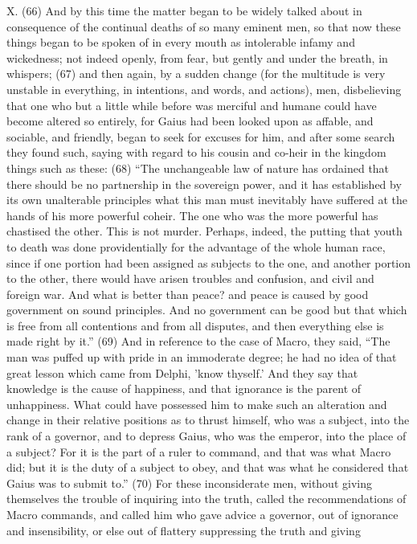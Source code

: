 X. (66) And by this time the matter began to be widely talked about in consequence of the continual
deaths of so many eminent men, so that now these things began to be spoken of in every mouth as
intolerable infamy and wickedness; not indeed openly, from fear, but gently and under the breath, in
whispers; (67) and then again, by a sudden change (for the multitude is very unstable in everything,
in intentions, and words, and actions), men, disbelieving that one who but a little while before was
merciful and humane could have become altered so entirely, for Gaius had been looked upon as
affable, and sociable, and friendly, began to seek for excuses for him, and after some search they
found such, saying with regard to his cousin and co-heir in the kingdom things such as these: (68)
``The unchangeable law of nature has ordained that there should be no partnership in the sovereign
power, and it has established by its own unalterable principles what this man must inevitably have
suffered at the hands of his more powerful coheir. The one who was the more powerful has
chastised the other. This is not murder. Perhaps, indeed, the putting that youth to death was done
providentially for the advantage of the whole human race, since if one portion had been assigned
as subjects to the one, and another portion to the other, there would have arisen troubles and
confusion, and civil and foreign war. And what is better than peace? and peace is caused by good
government on sound principles. And no government can be good but that which is free from all
contentions and from all disputes, and then everything else is made right by it.'' (69) And in
reference to the case of Macro, they said, ``The man was puffed up with pride in an immoderate
degree; he had no idea of that great lesson which came from Delphi, 'know thyself.' And they say
that knowledge is the cause of happiness, and that ignorance is the parent of unhappiness. What
could have possessed him to make such an alteration and change in their relative positions as to
thrust himself, who was a subject, into the rank of a governor, and to depress Gaius, who was the
emperor, into the place of a subject? For it is the part of a ruler to command, and that was what
Macro did; but it is the duty of a subject to obey, and that was what he considered that Gaius was
to submit to.'' (70) For these inconsiderate men, without giving themselves the trouble of inquiring
into the truth, called the recommendations of Macro commands, and called him who gave advice a
governor, out of ignorance and insensibility, or else out of flattery suppressing the truth and giving
